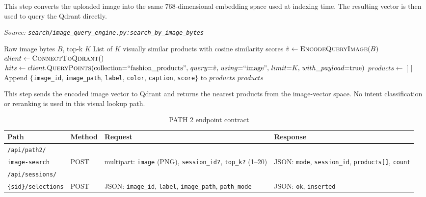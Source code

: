 This step converts the uploaded image into the same 768-dimensional embedding space used at indexing time. The resulting vector is then used to query the Qdrant directly.


\begin{algorithm}[H]
\caption{Search by Image Bytes}\label{alg:path2_search}
\textit{Source: \texttt{search/image\_query\_engine.py:search\_by\_image\_bytes}}
\begin{algorithmic}[1]
\Require Raw image bytes $B$, top-k $K$
\Ensure List of $K$ visually similar products with cosine similarity scores
    \State $\hat v \gets \textsc{EncodeQueryImage}(B)$
    \State $client \gets \textsc{ConnectToQdrant}()$
    \State $hits \gets client.\textsc{QueryPoints}(\text{collection}{=}\text{``fashion\_products''},\, query{=}\hat v,\, using{=}\text{``image''},\, limit{=}K,\, with\_payload{=}\text{true})$
    \State $products \gets []$
        \State Append $\{$\texttt{image\_id}, \texttt{image\_path}, \texttt{label}, \texttt{color}, \texttt{caption}, \texttt{score}$\}$ to $products$
    \EndFor
    \State \Return $products$
\EndFunction
\end{algorithmic}
\end{algorithm}

This step sends the encoded image vector to Qdrant and returns the nearest products from the image-vector space. No intent classification or reranking is used in this visual lookup path.

\begin{table}[H]
\centering
\small
\begin{tabular}{p{3.0cm}p{1.3cm}p{4.6cm}p{4.6cm}}
\toprule
\textbf{Path} & \textbf{Method} & \textbf{Request} & \textbf{Response}\\
\midrule
\texttt{/api/path2/}\\
\texttt{image-search} & POST & multipart: \texttt{image} (PNG), \texttt{session\_id?}, \texttt{top\_k?} (1--20) & JSON: \texttt{mode}, \texttt{session\_id}, \texttt{products[]}, \texttt{count}\\
\addlinespace
\texttt{/api/sessions/}\\
\texttt{\{sid\}/selections} & POST & JSON: \texttt{image\_id}, \texttt{label}, \texttt{image\_path}, \texttt{path\_mode} & JSON: \texttt{ok}, \texttt{inserted}\\
\bottomrule
\end{tabular}
\caption{PATH 2 endpoint contract}
\label{tab:path2_endpoints}
\end{table}

